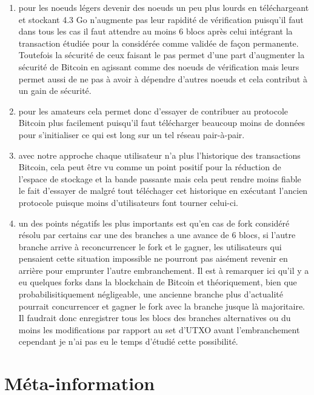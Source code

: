 \documentclass[12pt,a4paper]{article}
\begin{document}
	\begin{enumerate}
		\item pour les noeuds légers devenir des noeuds un peu plus lourds en téléchargeant et stockant 4.3 Go n'augmente pas leur rapidité de vérification puisqu'il faut dans tous les cas il faut attendre au moins 6 blocs après celui intégrant la transaction étudiée pour la considérée comme validée de façon permanente. Toutefois la sécurité de ceux faisant le pas permet d'une part d'augmenter la sécurité de Bitcoin en agissant comme des noeuds de vérification mais leurs permet aussi de ne pas à avoir à dépendre d'autres noeuds et cela contribut à un gain de sécurité.
		\item pour les amateurs cela permet donc d'essayer de contribuer au protocole Bitcoin plus facilement puisqu'il faut télécharger beaucoup moins de données pour s'initialiser ce qui est long sur un tel réseau pair-à-pair.
		\item avec notre approche chaque utilisateur n'a plus l'historique des transactions Bitcoin, cela peut être vu comme un point positif pour la réduction de l'espace de stockage et la bande passante mais cela peut rendre moins fiable le fait d'essayer de malgré tout téléchager cet historique en exécutant l'ancien protocole puisque moins d'utilisateurs font tourner celui-ci.
		\item un des points négatifs les plus importants est qu'en cas de fork considéré résolu par certains car une des branches a une avance de 6 blocs, si l'autre branche arrive à reconcurrencer le fork et le gagner, les utilisateurs qui pensaient cette situation impossible ne pourront pas aisément revenir en arrière pour emprunter l'autre embranchement. Il est à remarquer ici qu'il y a eu quelques forks dans la blockchain de Bitcoin et théoriquement, bien que probabilisitiquement négligeable, une ancienne branche plus d'actualité pourrait concurrencer et gagner le fork avec la branche jusque là majoritaire. Il faudrait donc enregistrer tous les blocs des branches alternatives ou du moins les modifications par rapport au set d'UTXO avant l'embranchement cependant je n'ai pas eu le temps d'étudié cette possibilité. %
	\end{enumerate}
	
	\section{Méta-information} %
	
\end{document}
